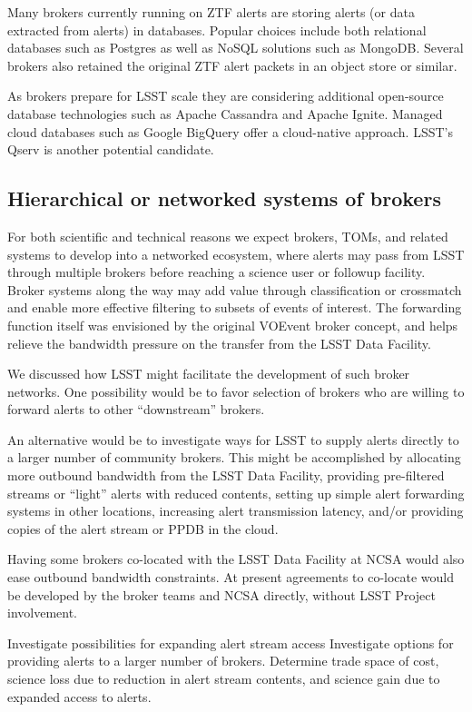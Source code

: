 Many brokers currently running on ZTF alerts are storing alerts (or data extracted from alerts) in databases.
Popular choices include both relational databases such as Postgres as well as NoSQL solutions such as MongoDB.
Several brokers also retained the original ZTF alert packets in an object store or similar.

As brokers prepare for LSST scale they are considering additional open-source database technologies such as Apache Cassandra and Apache Ignite.
Managed cloud databases such as Google BigQuery offer a cloud-native approach. 
LSST's Qserv \citep{2011Wang:2011:QDS:2063348.2063364} is another potential candidate.

\subsection{Hierarchical or networked systems of brokers}

For both scientific and technical reasons we expect brokers, TOMs, and related systems to develop into a networked ecosystem, where alerts may pass from LSST through multiple brokers before reaching a science user or followup facility.
Broker systems along the way may add value through classification or crossmatch and enable more effective filtering to subsets of events of interest.
The forwarding function itself was envisioned by the original VOEvent broker concept, and helps relieve the bandwidth pressure on the transfer from the LSST Data Facility.

We discussed how LSST might facilitate the development of such broker networks.
One possibility would be to favor selection of brokers who are willing to forward alerts to other ``downstream'' brokers.

An alternative would be to investigate ways for LSST to supply alerts directly to a larger number of community brokers.
This might be accomplished by allocating more outbound bandwidth from the LSST Data Facility, providing pre-filtered streams or ``light'' alerts with reduced contents, setting up simple alert forwarding systems in other locations, increasing alert transmission latency, and/or providing copies of the alert stream or PPDB in the cloud.

Having some brokers co-located with the LSST Data Facility at NCSA would also ease outbound bandwidth constraints.
At present agreements to co-locate would be developed by the broker teams and NCSA directly, without LSST Project involvement.

{Investigate possibilities for expanding alert stream access}
{Investigate options for providing alerts to a larger number of brokers. 
Determine trade space of cost, science loss due to reduction in alert stream contents, and science gain due to expanded access to alerts.}

